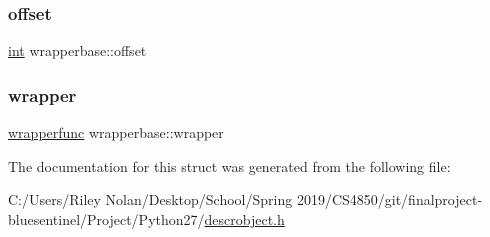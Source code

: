 \subsubsection{\texorpdfstring{offset}{offset}}
{\footnotesize\ttfamily \mbox{\hyperlink{warnings_8h_a74f207b5aa4ba51c3a2ad59b219a423b}{int}} wrapperbase\+::offset}

\mbox{\label{structwrapperbase_aaec58b56ee4db0e3c2dba8efa92c942f}} 
\subsubsection{\texorpdfstring{wrapper}{wrapper}}
{\footnotesize\ttfamily \mbox{\hyperlink{descrobject_8h_aa0427daa24e34913e3ab0a4cd794ee9b}{wrapperfunc}} wrapperbase\+::wrapper}



The documentation for this struct was generated from the following file\+:\begin{DoxyCompactItemize}
\item 
C\+:/\+Users/\+Riley Nolan/\+Desktop/\+School/\+Spring 2019/\+C\+S4850/git/finalproject-\/bluesentinel/\+Project/\+Python27/\mbox{\hyperlink{descrobject_8h}{descrobject.\+h}}\end{DoxyCompactItemize}

